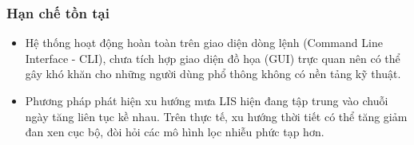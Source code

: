 \subsubsection{Hạn chế tồn tại}
\begin{itemize}
    \item Hệ thống hoạt động hoàn toàn trên giao diện dòng lệnh (Command Line Interface - CLI), chưa tích hợp giao diện đồ họa (GUI) trực quan nên có thể gây khó khăn cho những người dùng phổ thông không có nền tảng kỹ thuật.
    \item Phương pháp phát hiện xu hướng mưa LIS hiện đang tập trung vào chuỗi ngày tăng liên tục kề nhau. Trên thực tế, xu hướng thời tiết có thể tăng giảm đan xen cục bộ, đòi hỏi các mô hình lọc nhiễu phức tạp hơn.
\end{itemize}

